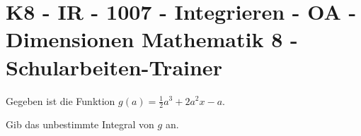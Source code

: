 \section{K8 - IR - 1007 - Integrieren - OA - Dimensionen Mathematik 8 - Schularbeiten-Trainer}

\begin{beispiel}[K8 - IR]{1}
Gegeben ist die Funktion $g(a)=\frac{1}{2}a^3+2a^2x-a$.

Gib das unbestimmte Integral von $g$ an.

\end{beispiel}